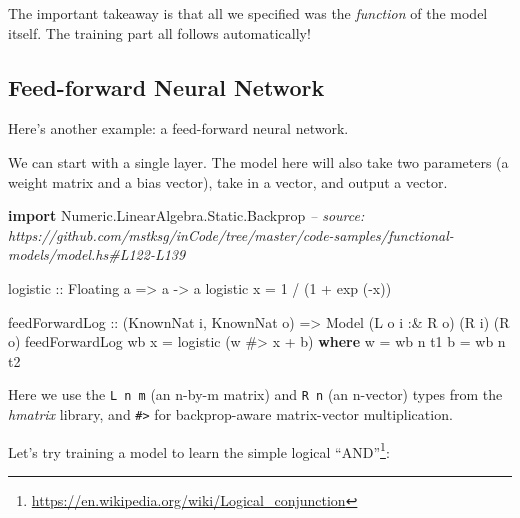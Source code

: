 \documentclass[]{article}
\newenvironment{Shaded}{}{}
\newcommand{\CommentTok}[1]{\textcolor[rgb]{0.38,0.63,0.69}{\textit{#1}}}
\newcommand{\DataTypeTok}[1]{\textcolor[rgb]{0.56,0.13,0.00}{#1}}
\newcommand{\DecValTok}[1]{\textcolor[rgb]{0.25,0.63,0.44}{#1}}
\newcommand{\FunctionTok}[1]{\textcolor[rgb]{0.02,0.16,0.49}{#1}}
\newcommand{\KeywordTok}[1]{\textcolor[rgb]{0.00,0.44,0.13}{\textbf{#1}}}
\newcommand{\NormalTok}[1]{#1}
\newcommand{\OtherTok}[1]{\textcolor[rgb]{0.00,0.44,0.13}{#1}}
\renewcommand{\href}[2]{#2\footnote{\url{#1}}}
\begin{document}
The important takeaway is that all we specified was the \emph{function} of the
model itself. The training part all follows automatically!

\hypertarget{feed-forward-neural-network}{%
\subsection{Feed-forward Neural Network}\label{feed-forward-neural-network}}

Here's another example: a feed-forward neural network.

We can start with a single layer. The model here will also take two parameters
(a weight matrix and a bias vector), take in a vector, and output a vector.

\begin{Shaded}
\begin{Highlighting}[]
\KeywordTok{import} \DataTypeTok{Numeric.LinearAlgebra.Static.Backprop}
\CommentTok{-- source: https://github.com/mstksg/inCode/tree/master/code-samples/functional-models/model.hs#L122-L139}

\OtherTok{logistic ::} \DataTypeTok{Floating}\NormalTok{ a }\OtherTok{=>}\NormalTok{ a }\OtherTok{->}\NormalTok{ a}
\NormalTok{logistic x }\FunctionTok{=} \DecValTok{1} \FunctionTok{/}\NormalTok{ (}\DecValTok{1} \FunctionTok{+}\NormalTok{ exp (}\FunctionTok{-}\NormalTok{x))}

\NormalTok{feedForwardLog}
\OtherTok{    ::}\NormalTok{ (}\DataTypeTok{KnownNat}\NormalTok{ i, }\DataTypeTok{KnownNat}\NormalTok{ o)}
    \OtherTok{=>} \DataTypeTok{Model}\NormalTok{ (}\DataTypeTok{L}\NormalTok{ o i }\FunctionTok{:&} \DataTypeTok{R}\NormalTok{ o) (}\DataTypeTok{R}\NormalTok{ i) (}\DataTypeTok{R}\NormalTok{ o)}
\NormalTok{feedForwardLog wb x }\FunctionTok{=}\NormalTok{ logistic (w }\FunctionTok{#>}\NormalTok{ x }\FunctionTok{+}\NormalTok{ b)}
  \KeywordTok{where}
\NormalTok{    w }\FunctionTok{=}\NormalTok{ wb }\FunctionTok{^^.}\NormalTok{ t1}
\NormalTok{    b }\FunctionTok{=}\NormalTok{ wb }\FunctionTok{^^.}\NormalTok{ t2}
\end{Highlighting}
\end{Shaded}

Here we use the \texttt{L\ n\ m} (an n-by-m matrix) and \texttt{R\ n} (an
n-vector) types from the \emph{hmatrix} library, and \texttt{\#\textgreater{}}
for backprop-aware matrix-vector multiplication.

Let's try training a model to learn the simple
\href{https://en.wikipedia.org/wiki/Logical_conjunction}{logical ``AND''}:
\end{document}

